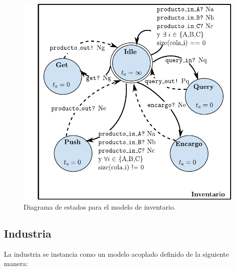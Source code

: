 \documentclass[10pt]{article}
\begin{document}
\begin{figure}[htbp]
	\centering
	\includegraphics{img/Inventariodevsgraph}
	\caption{Diagrama de estados para el modelo de inventario.}
	\label{fig:I-estados}
\end{figure}
\FloatBarrier

\subsection{Industria}
La industria se instancia como un modelo acoplado definido de la siguiente manera:\\
\end{document}
